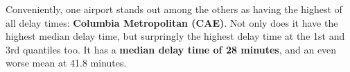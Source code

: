 \documentclass[]{article}
\begin{document}
Conveniently, one airport stands out among the others as having the
highest of all delay times: \textbf{Columbia Metropolitan (CAE)}. Not
only does it have the highest median delay time, but surpringly the
highest delay time at the 1st and 3rd quantiles too. It has a
\textbf{median delay time of 28 minutes}, and an even worse mean at 41.8
minutes.

\(~\)
\end{document}
